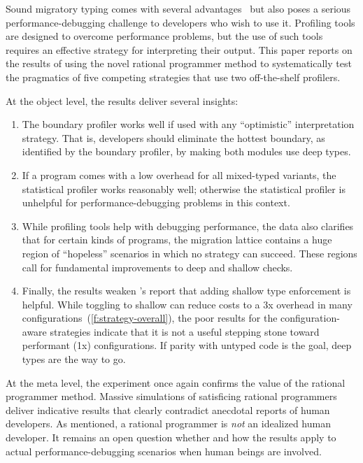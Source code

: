 

Sound migratory typing comes with several advantages~\cite{lgfd-icfp-2021,lgfd-icfp-2023} 
but also poses a serious performance-debugging challenge to
developers who wish to use it.
Profiling tools are designed to overcome performance problems, but the
use of such tools requires an effective strategy for interpreting their output.
This paper reports
on the results of using the novel rational programmer  method to
systematically test the pragmatics of five competing strategies that use two
off-the-shelf profilers.

At the object level, the results deliver several insights:
\begin{enumerate}
  \item
    The boundary profiler works well if used with any ``optimistic''
    interpretation strategy. That is, developers should eliminate the hottest
    boundary, as identified by the boundary profiler, by making both modules
    use deep types.

  \item
    If a program comes with a low overhead for all mixed-typed
    variants, the statistical profiler works reasonably well; otherwise the
    statistical profiler is unhelpful for performance-debugging problems in
    this context.

  \item
    While profiling tools help with debugging
    performance, the data also clarifies that for
    certain kinds of programs, the migration lattice contains a huge region
    of ``hopeless'' scenarios in which no strategy can succeed.
    These regions call for fundamental improvements to deep and shallow checks.

  \item
    Finally, the results weaken \citet{g-deep-shallow}'s report that
    adding shallow type enforcement is helpful.
    While toggling to shallow can reduce costs to a 3x overhead in many
    configurations~(\cref{f:strategy-overall}), the poor results for the
    configuration-aware strategies indicate that it is not a useful stepping
    stone toward performant (1x) configurations.
    If parity with untyped code is the goal, deep types are the way to go.
\end{enumerate}

At the meta level, the experiment once again confirms the value of the
rational programmer method. Massive simulations of satisficing rational
programmers deliver indicative results that clearly contradict anecdotal reports
of human developers. As mentioned, a rational programmer is {\em not\/} an
idealized human developer. It remains an open question whether and how the
results apply to actual performance-debugging scenarios when human beings are
involved.

